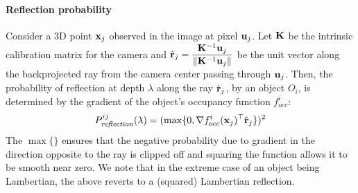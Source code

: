 \vspace{-0.3cm}
\paragraph{Reflection probability}
Consider a 3D point $\mathbf{x}_j$ observed in the image at pixel $\mathbf{u}_j$. Let $\mathbf{K}$ be the intrinsic calibration matrix for the camera and $\hat{\mathbf{r}}_j = \displaystyle\frac{\mathbf{K}^{-1}\mathbf{u}_j}{\lVert \mathbf{K}^{-1}\mathbf{u}_j \rVert}$ be the unit vector along the backprojected ray from the camera center passing through $\mathbf{u}_j$. Then, the probability of reflection at depth $\lambda$ along the ray $\hat{\mathbf{r}}_j$, by an object $O_i$, is determined by the gradient of the object's occupancy function $f_{occ}^i$:
\begin{align}
  P^{ij}_{\textit{reflection}} (\lambda) = (\max \{0, \nabla {f^i_{occ}}(\mathbf{x}_j)^\top \hat{\mathbf{r}}_j \})^2
\label{eq:evalPrefl}
\end{align}
The $\max \{ \}$ ensures that the negative probability due to gradient in the direction opposite to the ray is clipped off and squaring the function allows it to be smooth near zero. We note that in the extreme case of an object being Lambertian, the above reverts to a (squared) Lambertian reflection.


\vspace{-0.3cm}
